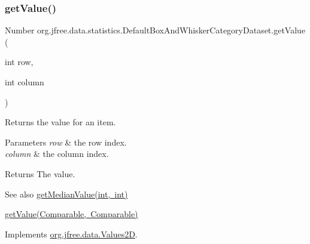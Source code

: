 \subsubsection{\texorpdfstring{get\+Value()}{getValue()}\hspace{0.1cm}{\footnotesize\ttfamily [1/2]}}
{\footnotesize\ttfamily Number org.\+jfree.\+data.\+statistics.\+Default\+Box\+And\+Whisker\+Category\+Dataset.\+get\+Value (\begin{DoxyParamCaption}\item[{int}]{row,  }\item[{int}]{column }\end{DoxyParamCaption})}

Returns the value for an item.


\begin{DoxyParams}{Parameters}
{\em row} & the row index. \\
\hline
{\em column} & the column index.\\
\hline
\end{DoxyParams}
\begin{DoxyReturn}{Returns}
The value.
\end{DoxyReturn}
\begin{DoxySeeAlso}{See also}
\mbox{\hyperlink{classorg_1_1jfree_1_1data_1_1statistics_1_1_default_box_and_whisker_category_dataset_a71fe367beb1408e129204aa19fa5502b}{get\+Median\+Value(int, int)}} 

\mbox{\hyperlink{classorg_1_1jfree_1_1data_1_1statistics_1_1_default_box_and_whisker_category_dataset_a1cc42e6e9cebb07fc3ad2bab59733088}{get\+Value(\+Comparable, Comparable)}} 
\end{DoxySeeAlso}


Implements \mbox{\hyperlink{interfaceorg_1_1jfree_1_1data_1_1_values2_d_a0797937d3ac62e18b300eef1fe906ec6}{org.\+jfree.\+data.\+Values2D}}.

\mbox{\label{classorg_1_1jfree_1_1data_1_1statistics_1_1_default_box_and_whisker_category_dataset_a1cc42e6e9cebb07fc3ad2bab59733088}} 
